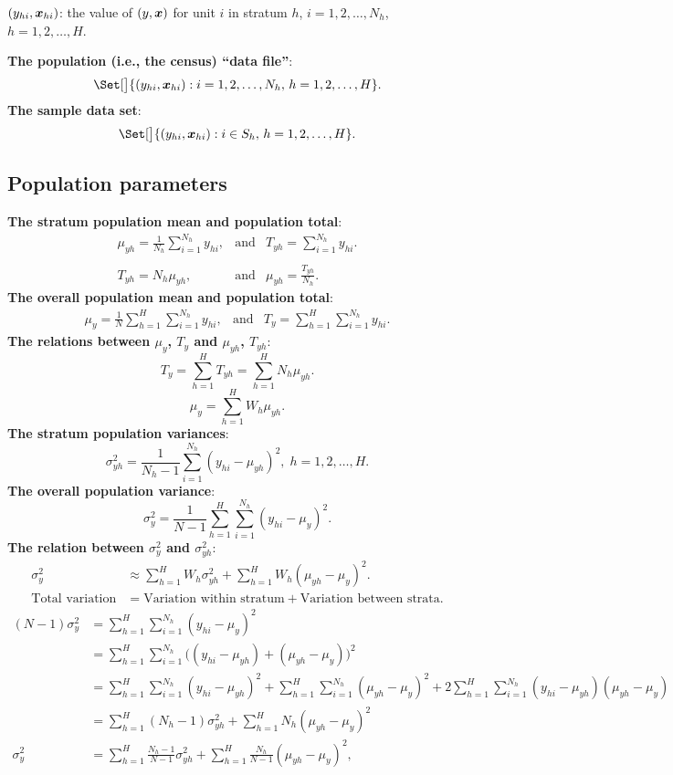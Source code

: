$ (y_{hi},\bm{x}_{hi}) $: the value of $ (y,\bm{x}) $ for unit $ i $
in stratum $ h $, $ i=1,2,\ldots,N_h $, $ h=1,2,\ldots,H $.

\textbf{The population (i.e., the census) ``data file''}:
\[ \Set[\big]{(y_{hi},\Vector{x}_{hi})\given i=1,2,\ldots,N_h,\, h=1,2,\ldots,H}. \]
\textbf{The sample data set}:
\[ \Set[\big]{(y_{hi},\Vector{x}_{hi})\given i\in S_h,\, h=1,2,\ldots,H}. \]
\subsection{Population parameters}

\textbf{The stratum population mean and population total}:
\[ \begin{matrix}
            \displaystyle \mu_{yh}=\frac{1}{N_h}\sum_{i=1}^{N_h}y_{hi}, & \text{and} & \displaystyle  T_{yh}=\sum_{i=1}^{N_h}y_{hi}. \\\\
            \displaystyle T_{yh}=N_h\mu_{yh},                           & \text{and} & \displaystyle \mu_{yh}=\frac{T_{yh}}{N_h}.
      \end{matrix} \]
\textbf{The overall population mean and population total}:
\[ \begin{matrix}
            \displaystyle \mu_y=\frac{1}{N}\sum_{h=1}^{H}\sum_{i=1}^{N_h}y_{hi}, & \text{and} & \displaystyle  T_y=\sum_{h=1}^{H}\sum_{i=1}^{N_h}y_{hi}.
      \end{matrix} \]
\textbf{The relations between $ \mu_y $, $ T_y $ and $ \mu_{yh} $, $ T_{yh} $}:
\[ T_y=\sum_{h=1}^{H}T_{yh}=\sum_{h=1}^{H}N_h\mu_{yh}. \]
\[ \mu_y=\sum_{h=1}^{H}W_h\mu_{yh}. \]
\textbf{The stratum population variances}:
\[ \sigma_{yh}^2=\frac{1}{N_h-1}\sum_{i=1}^{N_h}(y_{hi}-\mu_{yh})^2,\; h=1,2,\ldots,H. \]
\textbf{The overall population variance}:
\[ \sigma_y^2=\frac{1}{N-1}\sum_{h=1}^{H}\sum_{i=1}^{N_h}(y_{hi}-\mu_y)^2. \]
\textbf{The relation between $ \sigma_y^2 $ and $ \sigma_{yh}^2 $}:
\begin{align*}
      \sigma_y^2             & \approx \sum_{h=1}^{H}W_h \sigma_{yh}^2+\sum_{h=1}^{H}W_h(\mu_{yh}-\mu_y)^2. \\
      \text{Total variation} & =\text{Variation within stratum} + \text{Variation between strata}.
\end{align*}
\begin{align*}
      (N-1)\sigma_y^2
                 & =\sum_{h=1}^{H}\sum_{i=1}^{N_h}(y_{hi}-\mu_y)^2                                                      \\
                 & =\sum_{h=1}^{H}\sum_{i=1}^{N_h}\bigl((y_{hi}-\mu_{yh})+(\mu_{yh}-\mu_y)\bigr)^{\!2}                  \\
                 & =\sum_{h=1}^{H}\sum_{i=1}^{N_h}(y_{hi}-\mu_{yh})^2+\sum_{h=1}^{H}\sum_{i=1}^{N_h}(\mu_{yh}-\mu_y)^2+
      2\sum_{h=1}^{H}\sum_{i=1}^{N_h}(y_{hi}-\mu_{yh})(\mu_{yh}-\mu_y)                                                  \\
                 & =\sum_{h=1}^{H}(N_h-1)\sigma_{yh}^2+\sum_{h=1}^{H}N_h(\mu_{yh}-\mu_y)^2                              \\
      \sigma_y^2 & =\sum_{h=1}^{H}\frac{N_h-1}{N-1}\sigma_{yh}^2+\sum_{h=1}^{H}\frac{N_h}{N-1}(\mu_{yh}-\mu_y)^2,
\end{align*}

